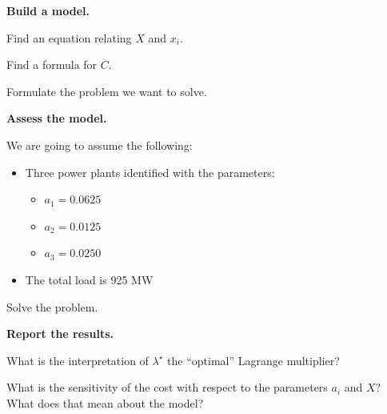 \documentclass{workbook}
\begin{document}
\begin{slide}

\textbf{Build a model.}

\begin{parts}
	\item Find an equation relating $X$ and $x_i$.
	\item Find a formula for $C$.
	\item Formulate the problem we want to solve.
	

\begin{slidesonly}
	\bigskip
\end{slidesonly}

\hspace{-2em}
\textbf{Assess the model.}

\hspace{-2em}
	We are going to assume the following:
	\begin{itemize}
		\item Three power plants identified with the parameters:
		\begin{itemize}
			\item $a_1 = 0.0625 $
			\item $a_2 = 0.0125 $
			\item $a_3 = 0.0250 $
		\end{itemize}
		\item The total load is 925 MW
	\end{itemize}


	\item Solve the problem.

\begin{slidesonly}
	\vspace{5cm}
\end{slidesonly}

\hspace{-2em}
\textbf{Report the results.}

	\item What is the interpretation of $\lambda^\star$ the ``optimal'' Lagrange multiplier?
	\item What is the sensitivity of the cost with respect to the parameters $a_i$ and $X$? What does that mean about the model?
		
\end{parts}
	
\end{slide}
\end{document}
